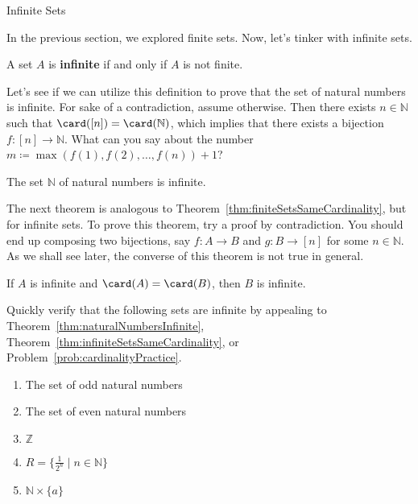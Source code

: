 \begin{section}{Infinite Sets}

In the previous section, we explored finite sets.  Now, let's tinker with infinite sets.

\begin{definition}\label{def:infiniteSet}
A set $A$ is \textbf{infinite} if and only if $A$ is not finite.
\end{definition}

Let's see if we can utilize this definition to prove that the set of natural numbers is infinite. For sake of a contradiction, assume otherwise.  Then there exists $n\in\mathbb{N}$ such that $\card([n])=\card(\mathbb{N})$, which implies that there exists a bijection $f:[n]\to \mathbb{N}$. What can you say about the number $m\coloneqq \max(f(1),f(2),\ldots,f(n))+1$?

\begin{theorem}\label{thm:naturalNumbersInfinite}
The set $\mathbb{N}$ of natural numbers is infinite.
\end{theorem}

The next theorem is analogous to Theorem~\ref{thm:finiteSetsSameCardinality}, but for infinite sets. To prove this theorem, try a proof by contradiction. You should end up composing two bijections, say $f:A\to B$ and $g:B\to [n]$ for some $n\in\mathbb{N}$. As we shall see later, the converse of this theorem is not true in general. 

\begin{theorem}\label{thm:infiniteSetsSameCardinality}
If $A$ is infinite and $\card(A)=\card(B)$, then $B$ is infinite.
\end{theorem}

\begin{problem}\label{prob:someInfiniteSets}
Quickly verify that the following sets are infinite by appealing to Theorem~\ref{thm:naturalNumbersInfinite}, Theorem~\ref{thm:infiniteSetsSameCardinality}, or Problem~\ref{prob:cardinalityPractice}.
\begin{enumerate}[label=\textrm{(\alph*)}]
\item The set of odd natural numbers
\item The set of even natural numbers
\item $\mathbb{Z}$
\item $R=\{\frac{1}{2^n}\mid n\in \mathbb{N}\}$
\item $\mathbb{N}\times \{a\}$
\end{enumerate}
\end{problem}


\end{section}
